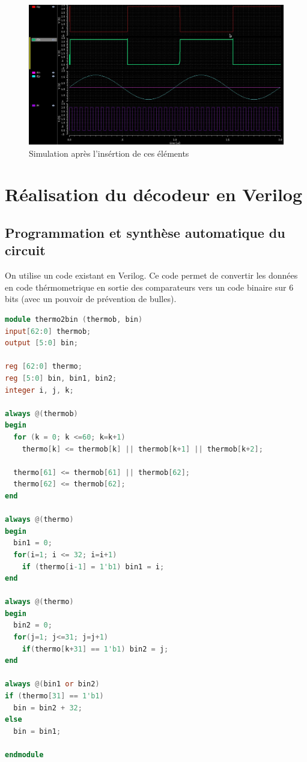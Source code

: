 \documentclass[11pt]{article}
\begin{document}
\begin{figure}[!htb]
      \centering
      \includegraphics[width=\linewidth]{sim_comp_after_SR_FF.jpg}
      \caption{Simulation apr\`es l'ins\'ertion de ces \'el\'ements}
      \label{fig:sfigASRFF}
\end{figure}%

\clearpage

\section{R\'ealisation du d\'ecodeur en Verilog}
\subsection{Programmation et synth\`ese automatique du circuit}
On utilise un code existant en Verilog\cite{Thermometer}.
Ce code permet de convertir les donn\'ees en code th\'ermometrique en sortie des
comparateurs vers un code binaire sur 6 bits (avec un pouvoir de pr\'evention de bulles).

\begin{lstlisting}[language=Verilog, belowskip=-0.5 \baselineskip]
module thermo2bin (thermob, bin)
input[62:0] thermob;
output [5:0] bin;

reg [62:0] thermo;
reg [5:0] bin, bin1, bin2;
integer i, j, k;

always @(thermob)
begin
  for (k = 0; k <=60; k=k+1)
    thermo[k] <= thermob[k] || thermob[k+1] || thermob[k+2];

  thermo[61] <= thermob[61] || thermob[62];
  thermo[62] <= thermob[62];
end

always @(thermo)
begin
  bin1 = 0;
  for(i=1; i <= 32; i=i+1)
    if (thermo[i-1] = 1'b1) bin1 = i;
end

always @(thermo)
begin
  bin2 = 0;
  for(j=1; j<=31; j=j+1)
    if(thermo[k+31] == 1'b1) bin2 = j;
end

always @(bin1 or bin2)
if (thermo[31] == 1'b1)
  bin = bin2 + 32;
else
  bin = bin1;

endmodule

\end{lstlisting}
\end{document}
